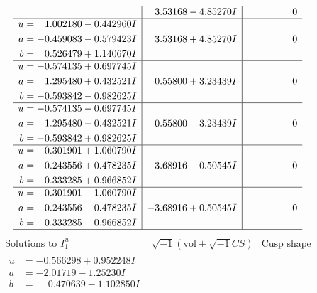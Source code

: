 \documentclass[1p]{elsarticle_modified}
\theoremstyle{definition}
\newcommand{\I}{\sqrt{-1}}
\begin{document}
$$\begin{array}{c|c|c}
 & \phantom{-}3.53168 - 4.85270 I & \phantom{-0.000000 } 0 \\ \hline\begin{aligned}
u &= \phantom{-}1.002180 - 0.442960 I \\
a &= -0.459083 - 0.579423 I \\
b &= \phantom{-}0.526479 + 1.140670 I\end{aligned}
 & \phantom{-}3.53168 + 4.85270 I & \phantom{-0.000000 } 0 \\ \hline\begin{aligned}
u &= -0.574135 + 0.697745 I \\
a &= \phantom{-}1.295480 + 0.432521 I \\
b &= -0.593842 - 0.982625 I\end{aligned}
 & \phantom{-}0.55800 + 3.23439 I & \phantom{-0.000000 } 0 \\ \hline\begin{aligned}
u &= -0.574135 - 0.697745 I \\
a &= \phantom{-}1.295480 - 0.432521 I \\
b &= -0.593842 + 0.982625 I\end{aligned}
 & \phantom{-}0.55800 - 3.23439 I & \phantom{-0.000000 } 0 \\ \hline\begin{aligned}
u &= -0.301901 + 1.060790 I \\
a &= \phantom{-}0.243556 + 0.478235 I \\
b &= \phantom{-}0.333285 + 0.966852 I\end{aligned}
 & -3.68916 - 0.50545 I & \phantom{-0.000000 } 0 \\ \hline\begin{aligned}
u &= -0.301901 - 1.060790 I \\
a &= \phantom{-}0.243556 - 0.478235 I \\
b &= \phantom{-}0.333285 - 0.966852 I\end{aligned}
 & -3.68916 + 0.50545 I & \phantom{-0.000000 } 0\\
 \hline 
 \end{array}$$\newpage$$\begin{array}{c|c|c}  
\text{Solutions to }I^u_{1}& \I (\text{vol} + \sqrt{-1}CS) & \text{Cusp shape}\\
 \hline 
\begin{aligned}
u &= -0.566298 + 0.952248 I \\
a &= -2.01719 - 1.25230 I \\
b &= \phantom{-}0.470639 - 1.102850 I\end{aligned}

\end{array}$$
\end{document}
